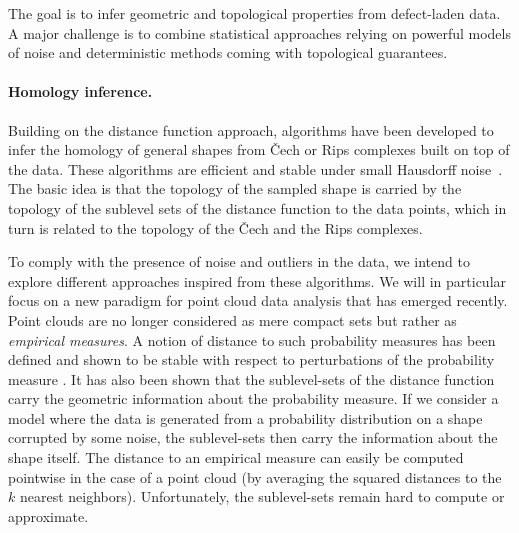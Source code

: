 

The goal is to infer geometric and topological properties from defect-laden data.
 A major challenge is to combine  statistical approaches relying on powerful models of noise and deterministic methods coming with topological guarantees.  



\paragraph{Homology inference.}
Building on the distance function approach, algorithms have been developed to infer the homology of general shapes from \v{C}ech or Rips complexes built on top of the data. 
These algorithms are efficient and stable under small Hausdorff noise~\cite{co-tpr-2008}. The basic idea is that the topology of the sampled shape is carried by the topology of the sublevel sets of the distance function to the data points, which in turn is  related to the topology of the \v{C}ech and the Rips complexes. 

To comply with the presence of noise and outliers in the data, we intend to explore different approaches inspired from these algorithms.  We will in particular focus on a new paradigm for point cloud data analysis that has emerged recently. Point clouds are no longer considered as mere compact sets but rather as {\em empirical measures}. A notion of distance to such probability measures has been defined and shown to be stable with respect to perturbations of the probability measure \cite{ccsm-gipm-2011}. It has also been shown that the sublevel-sets of the distance function carry the geometric information about the probability measure. If we consider a model where the data is generated from a probability distribution on a shape corrupted by some noise, the sublevel-sets then carry the information about the shape itself.
The distance to an empirical measure can easily be computed pointwise in the case of a point cloud (by averaging the squared distances to the $k$ nearest neighbors). Unfortunately, the sublevel-sets remain hard to compute or approximate.

